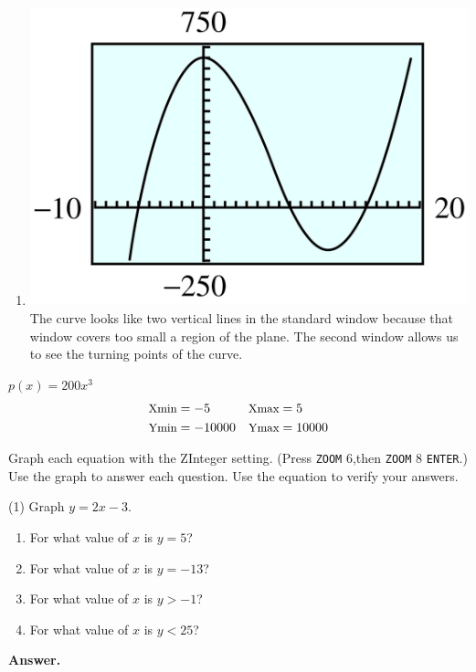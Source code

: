 \documentclass[10pt,]{book}
\theoremstyle{plain}
\theoremstyle{definition}
\theoremstyle{definition}
\theoremstyle{definition}
\theoremstyle{definition}
\numberwithin{equation}{part}
\newcommand{\lt}{<}
\newcommand{\gt}{>}
\newcommand{\amp}{&}
\begin{document}
\begin{exerciselist}
\begin{exercisegroup}
\begin{enumerate}[label=*\alph**]
%
\item\hypertarget{li-838}{}\includegraphics[width=0.6\linewidth]{images/fig-ans-GC-big-cubic.jpg}
 The curve looks like two vertical lines in the standard window because that window covers too small a region of the plane. The second window allows us to see the turning points of the curve.%
\end{enumerate}
%
\exercise[40.]\hypertarget{exercise-197}{}\(p(x) = 200x^3\)%
\begin{align*}
{\small\text{Xmin}} \amp = -5 \amp\amp {\small\text{Xmax}} = 5
\\
{\small\text{Ymin}} \amp = -10000 \amp\amp {\small\text{Ymax}} = 10000
\end{align*}
%
\end{exercisegroup}
\par\smallskip\noindent
\hypertarget{exercisegroup-23}{}\par\noindent Graph each equation with the ZInteger setting. (Press \lstinline?ZOOM? \(6\),then \lstinline?ZOOM? \(8\) \lstinline?ENTER?.) Use the graph to answer each question. Use the equation to verify your answers.%
\begin{exercisegroup}(1)
\exercise[41.]\hypertarget{exercise-198}{}Graph \(y = 2x - 3\). \leavevmode%
\begin{enumerate}[label=*\alph**]
\item\hypertarget{li-839}{}For what value of \(x\) is \(y = 5\)?%
\item\hypertarget{li-840}{}For what value of \(x\) is \(y = -13\)?%
\item\hypertarget{li-841}{}For what value of \(x\) is \(y\gt -1 \)?%
\item\hypertarget{li-842}{}For what value of \(x\) is \(y\lt 25\)?%
\end{enumerate}
%
\par\smallskip
\noindent\textbf{Answer.}\hypertarget{answer-113}{}\quad
\leavevmode%
\begin{multicols}{4}
\begin{enumerate}[label=*\alph**]

\end{enumerate}
\end{multicols}
\end{exercisegroup}
\end{exerciselist}
\end{document}
